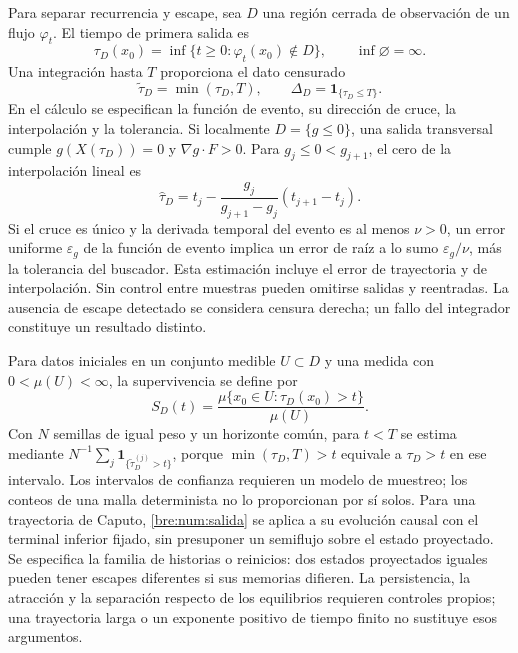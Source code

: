 Para separar recurrencia y escape, sea $D$ una región cerrada de observación de un
flujo $\varphi_t$. El tiempo de primera salida es
\begin{equation}
 \tau_D(x_0)=\inf\{t\geq0:\varphi_t(x_0)\notin D\},
 \qquad \inf\varnothing=\infty.
 \label{bre:num:salida}
\end{equation}
Una integración hasta $T$ proporciona el dato censurado
\begin{equation}
 \widetilde\tau_D=\min(\tau_D,T),\qquad
 \Delta_D=\mathbf1_{\{\tau_D\leq T\}}.
 \label{bre:num:censura}
\end{equation}
En el cálculo se especifican la función de evento, su dirección de cruce,
la interpolación y la tolerancia. Si localmente $D=\{g\leq0\}$, una salida
transversal cumple $g(X(\tau_D))=0$ y
$\nabla g\cdot F>0$. Para $g_j\leq0<g_{j+1}$, el cero de la interpolación
lineal es
\[
 \widehat\tau_D=t_j-
 \frac{g_j}{g_{j+1}-g_j}(t_{j+1}-t_j).
\]
Si el cruce es único y la derivada temporal del evento es al menos
$\nu>0$, un error uniforme $\varepsilon_g$ de la función de evento implica
un error de raíz a lo sumo $\varepsilon_g/\nu$, más la tolerancia del
buscador. Esta estimación incluye el error de trayectoria y de
interpolación. Sin control entre muestras pueden omitirse salidas y
reentradas. La ausencia de escape detectado se considera censura derecha;
un fallo del integrador constituye un resultado distinto.

Para datos iniciales en un conjunto medible $U\subset D$ y una medida con
$0<\mu(U)<\infty$, la supervivencia se define por
\begin{equation}
 S_D(t)=\frac{\mu\{x_0\in U:\tau_D(x_0)>t\}}{\mu(U)}.
 \label{bre:num:supervivencia}
\end{equation}
Con $N$ semillas de igual peso y un horizonte común, para $t<T$ se estima
mediante $N^{-1}\sum_j\mathbf1_{\{\widetilde\tau_D^{(j)}>t\}}$, porque
$\min(\tau_D,T)>t$ equivale a $\tau_D>t$ en ese intervalo. Los intervalos
de confianza requieren un modelo de muestreo; los conteos de una malla
determinista no lo proporcionan por sí solos. Para una trayectoria de Caputo, \eqref{bre:num:salida} se aplica a su
evolución causal con el terminal inferior fijado, sin presuponer un
semiflujo sobre el estado proyectado. Se especifica la familia de historias
o reinicios: dos estados proyectados iguales pueden
tener escapes diferentes si sus memorias difieren. La persistencia, la
atracción y la separación respecto de los equilibrios requieren controles
propios; una trayectoria larga o un exponente positivo de tiempo finito no
sustituye esos argumentos.
